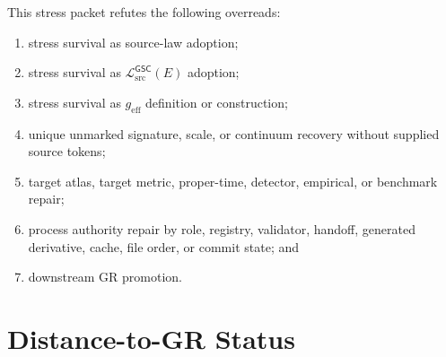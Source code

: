 \documentclass[11pt]{article}
\newcommand{\MetricData}{\mathcal{L}_{\mathrm{src}}^{\mathsf{GSC}}}
\newcommand{\geff}{g_{\mathrm{eff}}}
\begin{document}
This stress packet refutes the following overreads:
\begin{enumerate}[leftmargin=*]
  \item stress survival as source-law adoption;
  \item stress survival as \(\MetricData(E)\) adoption;
  \item stress survival as \(\geff\) definition or construction;
  \item unique unmarked signature, scale, or continuum recovery without
  supplied source tokens;
  \item target atlas, target metric, proper-time, detector, empirical, or
  benchmark repair;
  \item process authority repair by role, registry, validator, handoff,
  generated derivative, cache, file order, or commit state; and
  \item downstream GR promotion.
\end{enumerate}

\section{Distance-to-GR Status}
\end{document}

